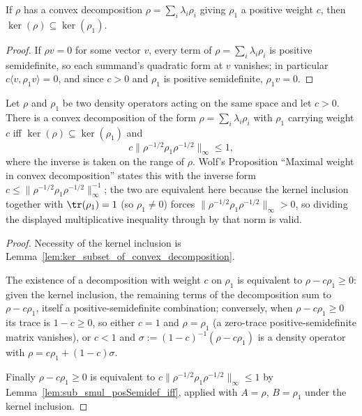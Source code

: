 \begin{lemma}
    \label{lem:ker_subset_of_convex_decomposition}
    \leanok
    If $\rho$ has a convex decomposition $\rho=\sum_i\lambda_i\rho_i$ giving
    $\rho_1$ a positive weight $c$, then $\ker(\rho)\subseteq\ker(\rho_1)$.
\end{lemma}

\begin{proof}\leanok
    If $\rho v=0$ for some vector $v$, every term of
    $\rho=\sum_i\lambda_i\rho_i$ is positive semidefinite, so each
    summand's quadratic form at $v$ vanishes; in particular
    $c\langle v,\rho_1v\rangle=0$, and since $c>0$ and $\rho_1$ is positive
    semidefinite, $\rho_1v=0$.
\end{proof}

\begin{theorem}
    \label{thm:maximal_weight_convex_decomposition}
    \leanok
    Let $\rho$ and $\rho_1$ be two density operators acting on the same
    space and let $c>0$. There is a convex decomposition of the form
    $\rho=\sum_i\lambda_i\rho_i$ with $\rho_1$ carrying weight $c$ iff
    $\ker(\rho)\subseteq\ker(\rho_1)$ and
    \[
        c\bigl\|\rho^{-1/2}\rho_1\rho^{-1/2}\bigr\|_\infty\le1,
    \]
    where the inverse is taken on the range of $\rho$. Wolf's Proposition
    ``Maximal weight in convex decomposition'' \cite{Wolf2012Quantum}
    states this with the inverse form $c\le\|\rho^{-1/2}\rho_1
    \rho^{-1/2}\|_\infty^{-1}$; the two are equivalent here because the
    kernel inclusion together with $\tr(\rho_1)=1$ (so $\rho_1\ne0$) forces
    $\|\rho^{-1/2}\rho_1\rho^{-1/2}\|_\infty>0$, so dividing the displayed
    multiplicative inequality through by that norm is valid.
\end{theorem}

\begin{proof}\leanok
    Necessity of the kernel inclusion is
    Lemma~\ref{lem:ker_subset_of_convex_decomposition}.

    The existence of a decomposition with weight $c$ on $\rho_1$ is
    equivalent to $\rho-c\rho_1\ge0$: given the kernel inclusion, the
    remaining terms of the decomposition sum to $\rho-c\rho_1$, itself a
    positive-semidefinite combination; conversely, when
    $\rho-c\rho_1\ge0$ its trace is $1-c\ge0$, so either $c=1$ and
    $\rho=\rho_1$ (a zero-trace positive-semidefinite matrix vanishes), or
    $c<1$ and $\sigma:=(1-c)^{-1}(\rho-c\rho_1)$ is a density operator with
    $\rho=c\rho_1+(1-c)\sigma$.

    Finally $\rho-c\rho_1\ge0$ is equivalent to
    $c\|\rho^{-1/2}\rho_1\rho^{-1/2}\|_\infty\le1$ by
    Lemma~\ref{lem:sub_smul_posSemidef_iff}, applied with $A=\rho$,
    $B=\rho_1$ under the kernel inclusion.
\end{proof}

